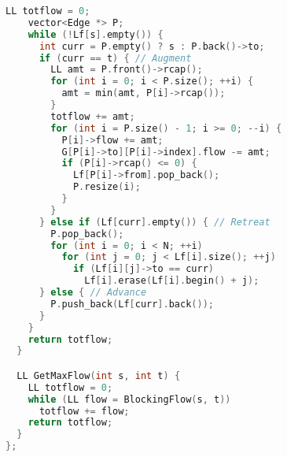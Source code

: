 \begin{lstlisting}[language=C++]
    LL totflow = 0;
    vector<Edge *> P;
    while (!Lf[s].empty()) {
      int curr = P.empty() ? s : P.back()->to;
      if (curr == t) { // Augment
        LL amt = P.front()->rcap();
        for (int i = 0; i < P.size(); ++i) {
          amt = min(amt, P[i]->rcap());
        }
        totflow += amt;
        for (int i = P.size() - 1; i >= 0; --i) {
          P[i]->flow += amt;
          G[P[i]->to][P[i]->index].flow -= amt;
          if (P[i]->rcap() <= 0) {
            Lf[P[i]->from].pop_back();
            P.resize(i);
          }
        }
      } else if (Lf[curr].empty()) { // Retreat
        P.pop_back();
        for (int i = 0; i < N; ++i)
          for (int j = 0; j < Lf[i].size(); ++j)
            if (Lf[i][j]->to == curr)
              Lf[i].erase(Lf[i].begin() + j);
      } else { // Advance
        P.push_back(Lf[curr].back());
      }
    }
    return totflow;
  }

  LL GetMaxFlow(int s, int t) {
    LL totflow = 0;
    while (LL flow = BlockingFlow(s, t))
      totflow += flow;
    return totflow;
  }
};

\end{lstlisting}
